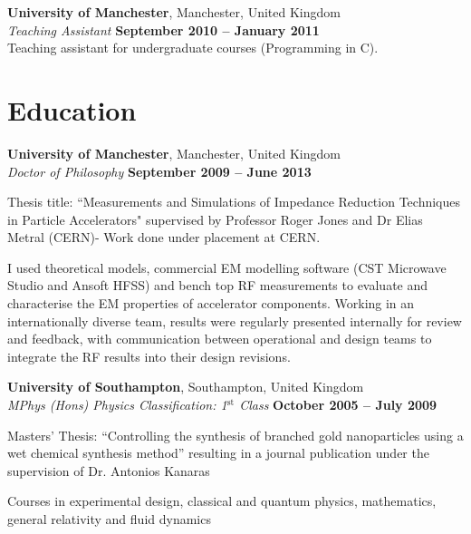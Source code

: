\documentclass[margin,line]{resume}
\begin{document}
\begin{resume}
    \textbf{University of Manchester}, Manchester, United Kingdom \vspace{1mm}\\\vspace{1mm}%
    \textsl{Teaching Assistant} \hfill \textbf{September 2010 -- January 2011}\\
    Teaching assistant for undergraduate courses (Programming in C).


    \section{\mysidestyle Education}

    \textbf{University of Manchester}, Manchester, United Kingdom \vspace{1mm}\\\vspace{1mm}%
    \textsl{Doctor of Philosophy} \hfill \textbf{ September 2009 -- June 2013}\vspace{-3mm}\\\vspace{-1mm}%
    \begin{list2}
        \item Thesis title: ``Measurements and Simulations of Impedance Reduction Techniques in Particle Accelerators" supervised by Professor Roger Jones and Dr Elias Metral (CERN)- Work done under placement at CERN.
        \item I used theoretical models, commercial EM modelling software (CST Microwave Studio and Ansoft HFSS) and bench top RF measurements to evaluate and characterise the EM properties of accelerator components. Working in an internationally diverse team, results were regularly presented internally for review and feedback, with communication between operational and design teams to integrate the RF results into their design revisions.
    \end{list2}\vspace{-1.5mm}
    \textbf{University of Southampton}, Southampton, United Kingdom \vspace{1mm}\\\vspace{1mm}%
    \textsl{MPhys (Hons) Physics Classification: 1$^{\mathrm{st}}$ Class} \hfill \textbf{October 2005 -- July 2009}\vspace{-3mm}\\\vspace{-1mm}%
    \begin{list2}
        \item Masters' Thesis: ``Controlling the synthesis of branched gold nanoparticles using a wet chemical synthesis method'' resulting in a journal publication under the supervision of Dr. Antonios Kanaras
        \item Courses in experimental design, classical and quantum physics, mathematics, general relativity and fluid dynamics
    \end{list2}\vspace{-1.5mm}


\end{resume}
\end{document}
